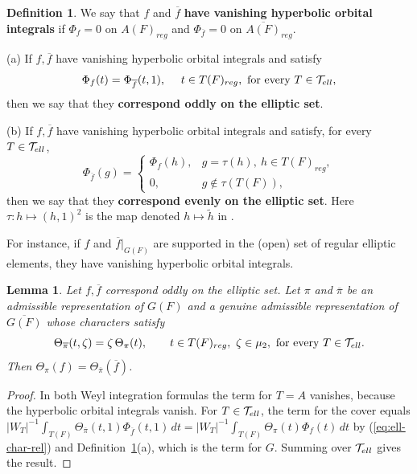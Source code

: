 \documentclass[12pt,letterpaper,openany]{book}
\theoremstyle{plain}
\newtheorem{lemma}[theorem]{Lemma}
\theoremstyle{definition}
\newtheorem{definition}[theorem]{Definition}
\theoremstyle{remark}
\theoremstyle{remark}
\begin{document}
\begin{definition}\label{def:ell-corr}
We say that $f$ and $\overline{f}$ {\bf have vanishing hyperbolic
orbital integrals} if $\Phi_f=0$ on $A(F)_{reg}$ and
$\Phi_{\overline f}=0$ on $\overline{A(F)}_{reg}$.

(a) If $f,\overline{f}$ have vanishing hyperbolic orbital integrals and
satisfy
\[
\Phi_f(t)=\Phi_{\overline{f}}(t,1),\ \ \ \ t\in T(F)_{reg},\ \text{for every } T\in{\cal T}_{ell},
\]
then we say that they \textbf{correspond oddly on the elliptic set}.

(b) If $f,\overline{f}$ have vanishing hyperbolic orbital integrals and
satisfy, for every $T\in{\cal T}_{ell}$,
\[
\Phi_{\overline{f}}(g)
=
\left\{
\begin{array}{ll}
\Phi_f(h), & g=\tau(h),\ h\in T(F)_{reg},\\
0, & g\notin \tau(T(F)),
\end{array}
\right.
\]
then we say that they \textbf{correspond evenly on the elliptic set}.
Here $\tau:h\longmapsto (h,1)^2$ is the map denoted
$h\longmapsto \tilde{h}$ in \cite{Fl}.
\end{definition}

For instance, if $f$ and $\overline{f}|_{G(F)}$ are supported in the
(open) set of regular elliptic elements, they have vanishing hyperbolic
orbital integrals.

\begin{lemma}\label{lem:ell-odd}
Let $f,\overline{f}$ correspond oddly on the elliptic set. Let $\pi$ and
$\overline{\pi}$ be an admissible representation of $G(F)$ and a genuine
admissible representation of $\overline{G(F)}$ whose characters satisfy
\begin{equation}\label{eq:ell-char-rel}
\Theta_{\overline{\pi}}(t,\zeta)=\zeta\,\Theta_\pi(t),\qquad
t\in T(F)_{reg},\ \zeta\in\mu_2,\ \text{for every }T\in{\cal T}_{ell}.
\end{equation}
Then $\Theta _{\pi }(f)=\Theta _{\overline{\pi }}(\overline{f})$.
\end{lemma}

\begin{proof}
In both Weyl integration formulas the term for $T=A$ vanishes, because
the hyperbolic orbital integrals vanish. For $T\in{\cal T}_{ell}$, the
term for the cover equals
$|W_T|^{-1}\int_{T(F)}\Theta_{\overline\pi}(t,1)\Phi_{\overline f}(t,1)\,dt
=|W_T|^{-1}\int_{T(F)}\Theta_{\pi}(t)\Phi_{f}(t)\,dt$ by
(\ref{eq:ell-char-rel}) and Definition~\ref{def:ell-corr}(a), which is
the term for $G$. Summing over ${\cal T}_{ell}$ gives the result.
\end{proof}
\end{document}
